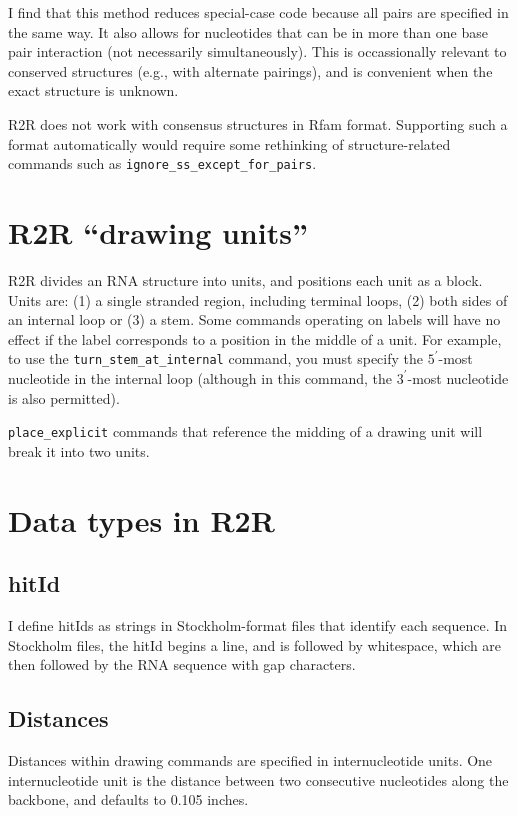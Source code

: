 \documentclass[letterpaper,12pt]{report}
\begin{document}
I find that this method reduces special-case code because all pairs are specified in the same way.
It also allows for nucleotides that can be in more than one base pair interaction (not necessarily simultaneously).
This is occassionally relevant to conserved structures (e.g., with alternate pairings), and is convenient
when the exact structure is unknown.

R2R does not work with consensus structures in Rfam format.
Supporting such a format automatically would require some rethinking of structure-related commands such
as {\tt ignore\_ss\_except\_for\_pairs}.

\section{R2R ``drawing units''}
\label{drawingunits}

R2R divides an RNA structure into units, and positions each unit as a block.
Units are: (1) a single
stranded region, including terminal loops, (2) both sides of an
internal loop or (3) a stem. 
Some commands operating on labels will have no effect if the label corresponds to a position in the middle
of a unit.
For example, to use the {\tt turn\_stem\_at\_internal} command, you must specify the $5^\prime$-most nucleotide
in the internal loop (although in this command, the $3^\prime$-most nucleotide is also permitted).

{\tt place\_explicit} commands that reference the midding of a drawing unit will break it into two units.

\section{Data types in R2R}

\subsection{hitId}
\label{hitId}

I define hitIds as strings in Stockholm-format files that identify each sequence.  In Stockholm files, the hitId begins a line, and is followed by whitespace, which are then followed by the RNA sequence with gap characters.

\subsection{Distances}

Distances within drawing commands are specified in internucleotide units.  One internucleotide unit
is the distance between two consecutive nucleotides along the backbone, and defaults to 0.105 inches.
\end{document}
